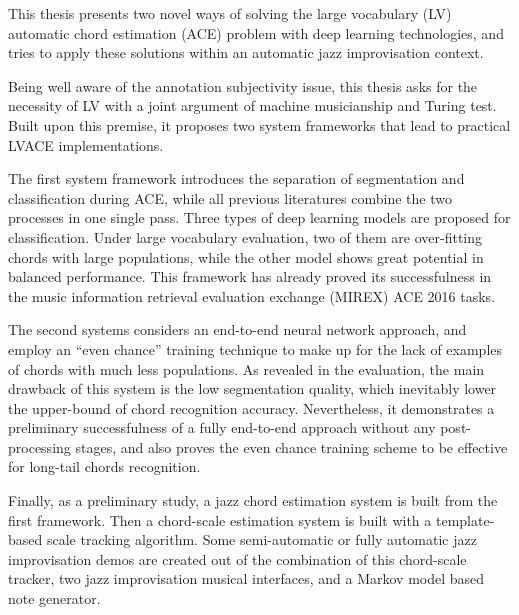 


\begin{abstracts}        %
This thesis presents two novel ways of solving the large vocabulary (LV) automatic chord estimation (ACE) problem with deep learning technologies, and tries to apply these solutions within an automatic jazz improvisation context.

Being well aware of the annotation subjectivity issue, this thesis asks for the necessity of LV with a joint argument of machine musicianship and Turing test. Built upon this premise, it proposes two system frameworks that lead to practical LVACE implementations.

The first system framework introduces the separation of segmentation and classification during ACE, while all previous literatures combine the two processes in one single pass. Three types of deep learning models are proposed for classification. Under large vocabulary evaluation, two of them are over-fitting chords with large populations, while the other model shows great potential in balanced performance. This framework has already proved its successfulness in the music information retrieval evaluation exchange (MIREX) ACE 2016 tasks.

The second systems considers an end-to-end neural network approach, and employ an ``even chance'' training technique to make up for the lack of examples of chords with much less populations. As revealed in the evaluation, the main drawback of this system is the low segmentation quality, which inevitably lower the upper-bound of chord recognition accuracy. Nevertheless, it demonstrates a preliminary successfulness of a fully end-to-end approach without any post-processing stages, and also proves the even chance training scheme to be effective for long-tail chords recognition.

Finally, as a preliminary study, a jazz chord estimation system is built from the first framework. Then a chord-scale estimation system is built with a template-based scale tracking algorithm. Some semi-automatic or fully automatic jazz improvisation demos are created out of the combination of this chord-scale tracker, two jazz improvisation musical interfaces, and a Markov model based note generator.


\end{abstracts}


